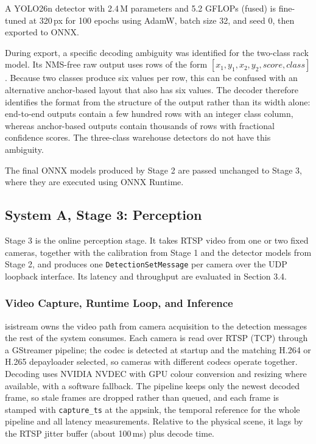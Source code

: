 \documentclass[9pt,a4paper,twocolumn]{rho-class/rho}
\begin{document}
A YOLO26n detector with 2.4\,M parameters and 5.2 GFLOPs (fused) is fine-tuned at 320\,px for 100 epochs using AdamW, batch size 32, and seed 0, then exported to ONNX.

During export, a specific decoding ambiguity was identified for the two-class rack model. Its NMS-free raw output uses rows of the form $[x_1, y_1, x_2, y_2, \mathit{score}, \mathit{class}]$. Because two classes produce six values per row, this can be confused with an alternative anchor-based layout that also has six values. The decoder therefore identifies the format from the structure of the output rather than its width alone: end-to-end outputs contain a few hundred rows with an integer class column, whereas anchor-based outputs contain thousands of rows with fractional confidence scores. The three-class warehouse detectors do not have this ambiguity.

The final ONNX models produced by Stage 2 are passed unchanged to Stage 3, where they are executed using ONNX Runtime.

\subsection{System A, Stage 3: Perception}

Stage 3 is the online perception stage. It takes RTSP video from one or two fixed cameras, together with the calibration from Stage 1 and the detector models from Stage 2, and produces one \texttt{DetectionSetMessage} per camera over the UDP loopback interface. Its latency and throughput are evaluated in Section 3.4.

\subsubsection{Video Capture, Runtime Loop, and Inference}

isistream owns the video path from camera acquisition to the detection messages the rest of the system consumes. Each camera is read over RTSP (TCP) through a GStreamer pipeline; the codec is detected at startup and the matching H.264 or H.265 depayloader selected, so cameras with different codecs operate together. Decoding uses NVIDIA NVDEC with GPU colour conversion and resizing where available, with a software fallback. The pipeline keeps only the newest decoded frame, so stale frames are dropped rather than queued, and each frame is stamped with \texttt{capture\_ts} at the appsink, the temporal reference for the whole pipeline and all latency measurements. Relative to the physical scene, it lags by the RTSP jitter buffer (about 100\,ms) plus decode time.
\end{document}
